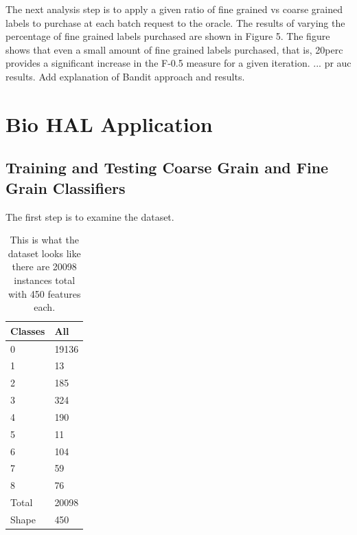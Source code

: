 \documentclass[ms]{nuthesis}
\begin{document}
\par The next analysis step is to apply a given ratio of fine grained vs coarse grained
labels to purchase at each batch request to the oracle. The results of varying the
percentage of fine grained labels purchased are shown in Figure 5. The figure shows
that even a small amount of fine grained labels purchased, that is, 20perc provides a
significant increase in the F-0.5 measure for a given iteration. ...  pr auc results.
Add explanation of Bandit approach and results.



\chapter{Bio HAL Application}\label{chap:math}
\section{Training and Testing Coarse Grain and Fine Grain Classifiers}
\par The first step is to examine the dataset.
\FloatBarrier
\begin{table}[h]
  \centering
  \begin{tabular}{|l||l|}\toprule
    Classes & All \\ \midrule
    0 & 19136 \\
    1 & 13 \\
    2 & 185 \\
    3 & 324 \\
    4 & 190 \\
    5 & 11 \\
    6 & 104 \\
    7 & 59 \\
    8 & 76 \\
    Total & 20098 \\
    Shape & 450 \\
 \bottomrule
  \end{tabular}
  \caption{This is what the dataset looks like there are 20098 instances total with 450 features each.}
  \label{tab:ClassesAll}
\end{table}
\FloatBarrier
\end{document}
